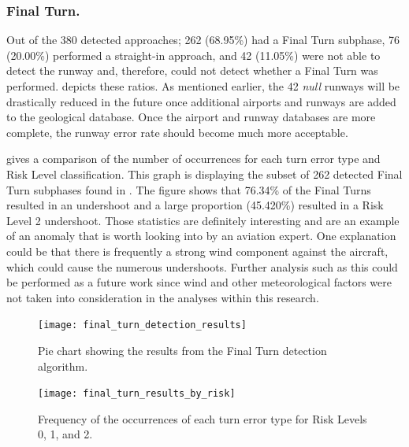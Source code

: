     
        \subsubsection{Final Turn.}
        
        	Out of the 380 detected approaches; 262 (68.95\%) had a Final Turn subphase, 76 (20.00\%) performed a straight-in approach, and 42 (11.05\%) were not able to detect the runway and, therefore, could not detect whether a Final Turn was performed.   depicts these ratios.  As mentioned earlier, the 42 \textit{null} runways will be drastically reduced in the future once additional airports and runways are added to the geological database.  Once the airport and runway databases are more complete, the runway error rate should become much more acceptable.
            
             gives a comparison of the number of occurrences for each turn error type and Risk Level classification.  This graph is displaying the subset of 262 detected Final Turn subphases found in .  The figure shows that 76.34\% of the Final Turns resulted in an undershoot and a large proportion (45.420\%) resulted in a Risk Level 2 undershoot.  Those statistics are definitely interesting and are an example of an anomaly that is worth looking into by an aviation expert.  One explanation could be that there is frequently a strong wind component against the aircraft, which could cause the numerous undershoots.  Further analysis such as this could be performed as a future work since wind and other meteorological factors were not taken into consideration in the analyses within this research.
            
            \begin{figure}
            	\centering
                \texttt{[image: final\_turn\_detection\_results]}
                \caption{Pie chart showing the results from the Final Turn detection algorithm.}
                \label{fig:final_turn_results_ratios}
            \end{figure}
            
            \begin{figure}
            	\centering
                \texttt{[image: final\_turn\_results\_by\_risk]}
                \caption{Frequency of the occurrences of each turn error type for Risk Levels 0, 1, and 2.}
                \label{fig:final_turn_results_by_risk}
            \end{figure}
            

